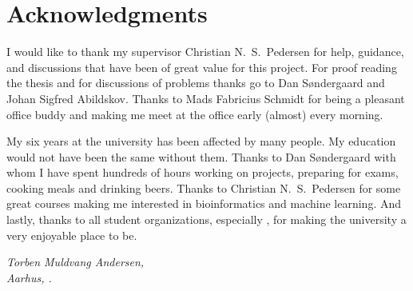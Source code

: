 \chapter*{Acknowledgments}

I would like to thank my supervisor Christian N.\ S.\ Pedersen for help,
guidance, and discussions that have been of great value for this project. For
proof reading the thesis and for discussions of problems thanks go to Dan
Søndergaard and Johan Sigfred Abildskov. Thanks to Mads Fabricius Schmidt for
being a pleasant office buddy and making me meet at the office early (almost)
every morning.

My six years at the university has been affected by many people. My education would not
have been the same without them. Thanks to Dan Søndergaard with whom I have
spent hundreds of hours working on projects, preparing for exams, cooking meals
and drinking beers. Thanks to Christian N.\ S.\ Pedersen for some great courses
making me interested in bioinformatics and machine learning. And lastly, thanks
to all student organizations, especially \TKET{}, for making the university a
very enjoyable place to be.

\vspace{2ex}
\begin{flushright}
  \emph{Torben Muldvang Andersen,}\\
  \emph{Aarhus, .}
\end{flushright}

